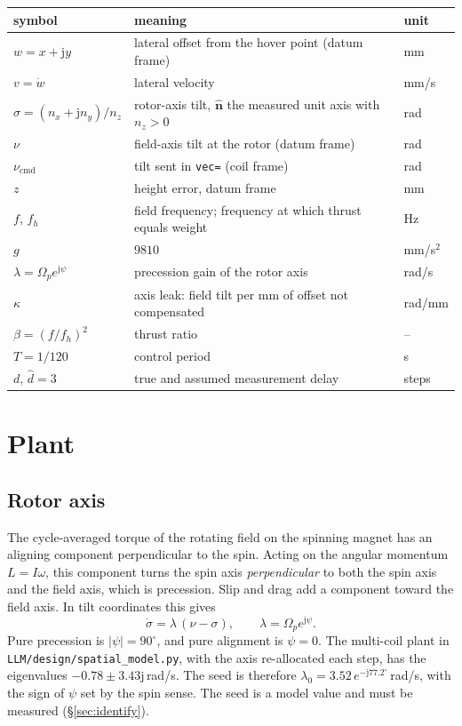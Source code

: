 \documentclass[11pt]{article}
\newcommand{\uv}[1]{\hat{\mathbf{#1}}}
\newcommand{\jj}{\mathrm{j}}
\begin{document}
\begin{center}\begin{tabular}{lll}
\toprule
symbol & meaning & unit \\ \midrule
$w=x+\jj y$ & lateral offset from the hover point (datum frame) & mm \\
$v=\dot w$ & lateral velocity & mm/s \\
$\sigma=(n_x+\jj n_y)/n_z$ & rotor-axis tilt, $\uv n$ the measured unit axis with $n_z>0$ & rad \\
$\nu$ & field-axis tilt at the rotor (datum frame) & rad \\
$\nu_{\mathrm{cmd}}$ & tilt sent in \texttt{vec=} (coil frame) & rad \\
$z$ & height error, datum frame & mm \\
$f$, $f_h$ & field frequency; frequency at which thrust equals weight & Hz \\
$g$ & $9810$ & mm/s$^2$ \\
$\lambda=\Omega_p e^{\jj\psi}$ & precession gain of the rotor axis & rad/s \\
$\kappa$ & axis leak: field tilt per mm of offset not compensated & rad/mm \\
$\beta=(f/f_h)^2$ & thrust ratio & -- \\
$T=1/120$ & control period & s \\
$d$, $\hat d=3$ & true and assumed measurement delay & steps \\
\bottomrule
\end{tabular}\end{center}

\section{Plant}
\label{sec:model}

\subsection{Rotor axis}
The cycle-averaged torque of the rotating field on the spinning magnet has an aligning component
perpendicular to the spin. Acting on the angular momentum $L=I\omega$, this component turns the
spin axis \emph{perpendicular} to both the spin axis and the field axis, which is precession. Slip
and drag add a component toward the field axis. In tilt coordinates this gives
\begin{equation}
\dot\sigma=\lambda\,(\nu-\sigma),\qquad \lambda=\Omega_p e^{\jj\psi}.\label{eq:precession}
\end{equation}
Pure precession is $|\psi|=90^\circ$, and pure alignment is $\psi=0$. The multi-coil plant in
\texttt{LLM/design/spatial\_model.py}, with the axis re-allocated each step, has the eigenvalues
$-0.78\pm 3.43\jj$\,rad/s. The seed is therefore $\lambda_0=3.52\,e^{-\jj 77.2^\circ}$\,rad/s, with
the sign of $\psi$ set by the spin sense. The seed is a model value and must be measured
(\S\ref{sec:identify}).
\end{document}
